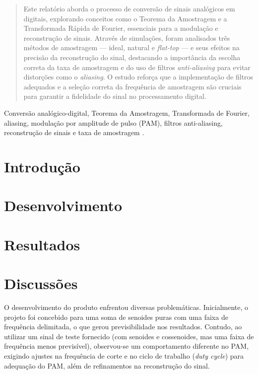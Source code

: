 \documentclass[conference]{IEEEtran}
\begin{document}
\begin{abstract}
Este relatório aborda o processo de conversão de sinais analógicos em digitais, explorando conceitos como o Teorema da Amostragem e a Transformada Rápida de Fourier, essenciais para a modulação e reconstrução de sinais. Através de simulações, foram analisados três métodos de amostragem — ideal, natural e \textit{flat-top} — e seus efeitos na precisão da reconstrução do sinal, destacando a importância da escolha correta da taxa de amostragem e do uso de filtros \textit{anti-aliasing} para evitar distorções como o \textit{aliasing}. O estudo reforça que a implementação de filtros adequados e a seleção correta da frequência de amostragem são cruciais para garantir a fidelidade do sinal no processamento digital. 
\end{abstract}

\begin{IEEEkeywords}
Conversão analógico-digital, Teorema da Amostragem, Transformada de Fourier, aliasing, modulação por amplitude de pulso (PAM), filtros anti-aliasing, reconstrução de sinais e taxa de amostragem .
\end{IEEEkeywords}

\section{Introdução}


\section{Desenvolvimento}


\section{Resultados}


\section{Discussões}
O desenvolvimento do produto enfrentou diversas problemáticas. Inicialmente, o projeto foi concebido para uma soma de senoides puras com uma faixa de frequência delimitada, o que gerou previsibilidade nos resultados. Contudo, ao utilizar um sinal de teste fornecido (com senoides e cossenoides, mas uma faixa de frequência menos previsível), observou-se um comportamento diferente no PAM, exigindo ajustes na frequência de corte e no ciclo de trabalho (\textit{duty cycle}) para adequação do PAM, além de refinamentos na reconstrução do sinal.
\end{document}
